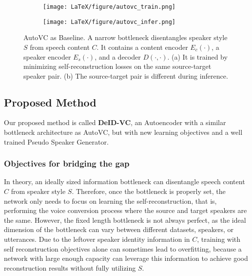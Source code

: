 \documentclass[a4paper]{article}
\begin{document}
    
    \begin{figure}[th]
        \begin{subfigure}[c]{0.49\columnwidth}
            \centering
            \texttt{[image: LaTeX/figure/autovc\_train.png]}
        \end{subfigure}\hfill
        \begin{subfigure}[c]{0.49\columnwidth}
            \centering
            \texttt{[image: LaTeX/figure/autovc\_infer.png]}
        \end{subfigure}
        \caption{AutoVC as Baseline. A narrow bottleneck disentangles speaker style $S$ from speech content $C$. It contains a content encoder $E_c(\cdot)$, a speaker encoder $E_s(\cdot)$, and a decoder $D(\cdot,\cdot)$. (a) It is trained by minimizing self-reconstruction losses on the same source-target speaker pair. (b) The source-target pair is different during inference.}
        \label{fig:baseline figure}
    \end{figure}

\subsection{Proposed Method}
    Our proposed method is called \textbf{DeID-VC}, an Autoencoder with a similar bottleneck architecture as AutoVC, but with new learning objectives and a well trained Pseudo Speaker Generator.
    
\subsubsection{Objectives for bridging the gap}
    In theory, an ideally sized information bottleneck can disentangle speech content $C$ from speaker style $S$. Therefore, once the bottleneck is properly set, the network only needs to focus on learning the self-reconstruction, that is, performing the voice conversion process where the source and target speakers are the same. However, the fixed length bottleneck is not always perfect, as the ideal dimension of the bottleneck can vary between different datasets, speakers, or utterances. Due to the leftover speaker identity information in $C$, training with self reconstruction objectives alone can sometimes lead to overfitting, because a network with large enough capacity can leverage this information to achieve good reconstruction results without fully utilizing $S$. 
    
\end{document}
